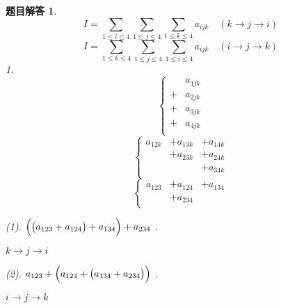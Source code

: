 \documentclass[mode=geye]{elegantnote}
\newtheorem{answer}{题目解答}
\begin{document}
\begin{answer}
    \begin{equation}
        I = 
        \sum_{1\leqslant i\leqslant 4}
        \sum_{1\leqslant j\leqslant 4}
        \sum_{1\leqslant k\leqslant 4}
        a_{ijk}
        \quad (k\rightarrow j\rightarrow i)
    \end{equation}
    \begin{equation}
        I = 
        \sum_{1\leqslant k\leqslant 4}
        \sum_{1\leqslant j\leqslant 4}
        \sum_{1\leqslant i\leqslant 4}
        a_{ijk}
        \quad (i\rightarrow j\rightarrow k)
    \end{equation}
    1.
    \begin{equation*}
        \left\{
            \begin{array}{ll}
                 & a_{1jk} \\
                +& a_{2jk} \\
                +& a_{3jk} \\
                +& a_{4jk} \\
            \end{array}
        \right.
    \end{equation*}
    \begin{equation*}
        \left\{
            \begin{array}{lll}
                a_{12k} &+ a_{13k} &+ a_{14k} \\
                &+ a_{23k} &+ a_{24k} \\
                &          &+ a_{34k} \\
            \end{array}
        \right.
    \end{equation*}
    \begin{equation*}
        \left\{
            \begin{array}{lll}
                a_{123} &+a_{124} &+a_{134} \\
                &+a_{234}& \\
            \end{array}
        \right.
    \end{equation*}

    (1). $ \Bigl(\bigl(a_{123}+a_{124}\bigr)+a_{134}\Bigr)+a_{234} $ .
    
    $ k\rightarrow j\rightarrow i $ 

    (2). $ a_{123}+\Bigl(a_{124}+\bigl(a_{134}+a_{234}\bigr)\Bigr) $ .
    
    $ i\rightarrow j\rightarrow k $ 
\end{answer}
\end{document}

